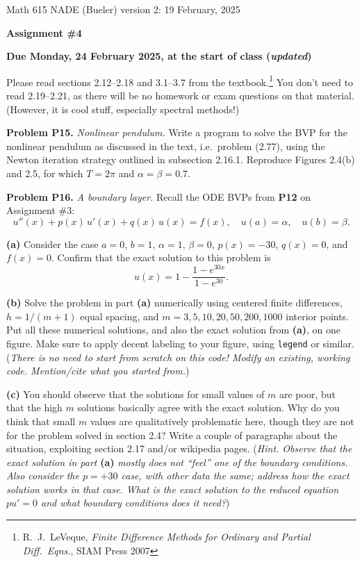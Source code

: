 \documentclass[12pt]{amsart}
\newcommand{\prob}[1]{\bigskip\noindent\textbf{#1}\quad }
\newcommand{\epart}[1]{\medskip\noindent\textbf{(#1)}\quad }
\begin{document}
\scriptsize \noindent Math 615 NADE (Bueler) \hfill version 2: 19 February, 2025
\normalsize

\medskip\bigskip

\Large\centerline{\textbf{Assignment \#4}}
\large
\bigskip

\centerline{{\color{BrickRed} \textbf{Due Monday, 24 February 2025, at the start of class (\emph{updated})}}}
\bigskip
\normalsize

\thispagestyle{empty}

\bigskip
Please read sections 2.12--2.18 and 3.1--3.7 from the textbook.\footnote{R.~J.~LeVeque, \emph{Finite Difference Methods for Ordinary and Partial Diff.~Eqns.}, SIAM Press 2007}  You don't need to read 2.19--2.21, as there will be no homework or exam questions on that material.  (However, it is cool stuff, especially spectral methods!)

\prob{Problem P15.}  \emph{Nonlinear pendulum.}   Write a program to solve the BVP for the nonlinear pendulum as discussed in the text, i.e.~problem (2.77), using the Newton iteration strategy outlined in subsection 2.16.1.  Reproduce Figures 2.4(b) and 2.5, for which $T=2\pi$ and $\alpha=\beta=0.7$.


\prob{Problem P16.}  \emph{A boundary layer.}   Recall the ODE BVPs from \textbf{P12} on Assignment \#3:
\begin{equation*}
u''(x) + p(x)\, u'(x) + q(x)\, u(x) = f(x), \quad u(a) = \alpha, \quad u(b) = \beta.
\end{equation*}

\epart{a}  Consider the case $a=0$, $b=1$, $\alpha=1$, $\beta=0$, $p(x)=-30$, $q(x)=0$, and $f(x)=0$.  Confirm that the exact solution to this problem is
    $$u(x) = 1 - \frac{1 - e^{30x}}{1-e^{30}}.$$

\epart{b}  Solve the problem in part \textbf{(a)} numerically using centered finite differences, $h=1/(m+1)$ equal spacing, and $m=3,5,10,20,50,200,1000$ interior points.  Put all these numerical solutions, and also the exact solution from \textbf{(a)}, on one figure.  Make sure to apply decent labeling to your figure, using \texttt{legend} or similar.  (\emph{There is no need to start from scratch on this code!  Modify an existing, working code.  Mention/cite what you started from.})

\epart{c}  You should observe that the solutions for small values of $m$ are poor, but that the high $m$ solutions basically agree with the exact solution.  Why do you think that small $m$ values are qualitatively problematic here, though they are not for the problem solved in section 2.4?   Write a couple of paragraphs about the situation, exploiting section 2.17 and/or wikipedia pages. (\emph{Hint.  Observe that the exact solution in part} \textbf{(a)} \emph{mostly does not ``feel'' one of the boundary conditions.  Also consider the $p=+30$ case, with other data the same; address how the exact solution works in that case.  What is the exact solution to the reduced equation $pu'=0$ and what boundary conditions does it need?})
\end{document}
